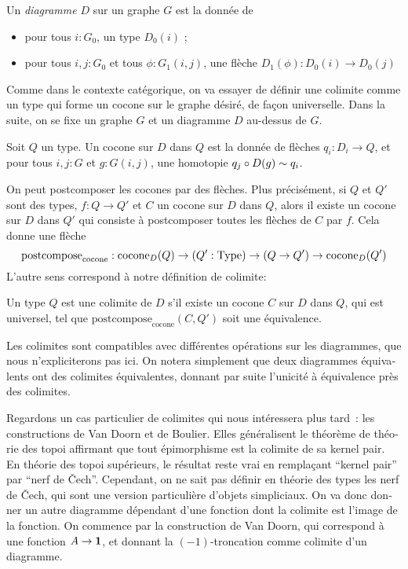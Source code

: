 \begin{otherlanguage}{french}
\begin{defifr}[Diagramme]
  Un {\em diagramme} $D$ sur un graphe $G$ est la donnée de
  \begin{itemize}
  \item pour tous $i:G_0$, un type $D_0(i)$ ;
  \item pour tous $i,j:G_0$ et tous $\phi : G_1(i,j)$, une flèche $D_1(\phi)
    : D_0(i) \to D_0(j)$
  \end{itemize}
\end{defifr}

Comme dans le contexte catégorique, on va essayer de définir une
colimite comme un type qui forme un cocone sur le graphe désiré, de
façon universelle. Dans la suite, on se fixe un graphe $G$ et un
diagramme $D$ au-dessus de $G$.

\begin{defifr}
  Soit $Q$ un type. Un cocone sur $D$ dans $Q$ est la donnée de
  flèches $q_i : D_i \to Q$, et pour tous $i,j:G$ et $g:G(i,j)$, une
  homotopie $q_j \circ D(g) \sim q_i$.
\end{defifr}

On peut postcomposer les cocones par des flèches. Plus précisément, si
$Q$ et $Q'$ sont des types, $f:Q \to Q'$ et $C$ un cocone sur $D$ dans
$Q$, alors il existe un cocone sur $D$ dans $Q'$ qui consiste à
postcomposer toutes les flèches de $C$ par $f$. Cela donne une flèche
\newcommand{\postcomposecocone}{\mathrm{postcompose}_{\mathrm{cocone}}}
\[\postcomposecocone : \cocone_D(Q) \to (Q':\Type) \to (Q \to Q') \to
  \cocone_D(Q') \]
L'autre sens correspond à notre définition de colimite:

\begin{defifr}[Colimite]
  Un type $Q$ est une colimite de $D$ s'il existe un cocone $C$ sur
  $D$ dans $Q$, qui est universel, \ie{} tel que
  $\postcomposecocone(C,Q')$ soit une équivalence.
\end{defifr}

Les colimites sont compatibles avec différentes opérations sur les
diagrammes, que nous n'expliciterons pas ici. On notera simplement que
deux diagrammes équivalents ont des colimites équivalentes, donnant
par suite l'unicité à équivalence près des colimites.

Regardons un cas particulier de colimites qui nous intéressera plus
tard~: les constructions de Van Doorn et de Boulier.
Elles généralisent le théorème de théorie des topoi affirmant que tout
épimorphisme est la colimite de sa kernel pair. En théorie des topoi
supérieurs, le résultat reste vrai en remplaçant ``kernel pair'' par
``nerf de \v{C}ech''. Cependant, on ne sait pas définir en
théorie des types les nerf de
\v{C}ech, qui sont une version particulière d'objets simpliciaux. On
va donc donner un autre diagramme dépendant d'une fonction dont la
colimite est l'image de la fonction. On commence par la construction
de Van Doorn, qui correspond à une fonction $A\to\mathbf{1}$, et donnant la
$(-1)$-troncation comme colimite d'un diagramme.




\end{otherlanguage}
